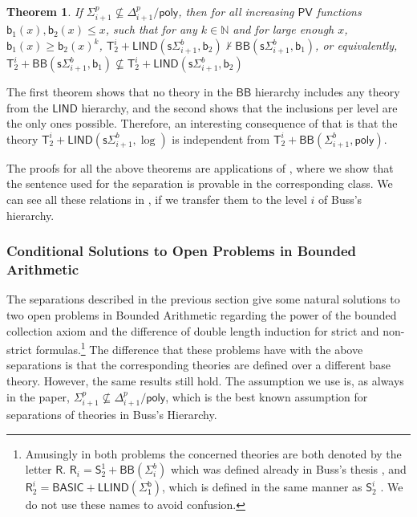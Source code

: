 \documentclass[11pt]{article}
\newcommand{\poly}{\mathsf{poly}}
\newcommand{\N}{\mathbb{N}}
\newcommand{\PV}{\mathsf{PV}}
\newcommand{\SOT}{\mathsf{S}^1_2}
\newcommand{\bd}{\mathsf{b}}
\newtheorem{theorem}{Theorem}[section]
\theoremstyle{definition}
\theoremstyle{definition}
\theoremstyle{remark}
\begin{document}
\begin{theorem}\label{thm:lindbbsep}
    If $\Sigma^p_{i+1}\not\subseteq \Delta^p_{i+1}/\poly$, then for all increasing $\PV$ functions $\bd_1(x), \bd_2(x) \leq x$, such that for any $k\in\N$ and for large enough $x$, $\bd_1(x)\geq \bd_2(x)^k$, $\mathsf{T}^i_2+\mathsf{LIND}(\mathsf{s}\Sigma^b_{i+1},\bd_2)\not\vdash \mathsf{BB}(\mathsf{s}\Sigma^b_{i+1},\bd_1)$, or equivalently, $\mathsf{T}^i_2+\mathsf{BB}(\mathsf{s}\Sigma^b_{i+1},\bd_1)\not\subseteq \mathsf{T}^i_2+\mathsf{LIND}(\mathsf{s}\Sigma^b_{i+1},\bd_2)$ 
\end{theorem}

The first theorem shows that no theory in the $\mathsf{BB}$ hierarchy includes any theory from the $\mathsf{LIND}$ hierarchy, and the second shows that the inclusions per level are the only ones possible. Therefore, an interesting consequence of that is that the theory $\mathsf{T}^i_2+\mathsf{LIND}(\mathsf{s}\Sigma^b_{i+1},\log)$ is independent from $\mathsf{T}^i_2+\mathsf{BB}(\Sigma^b_{i+1},\poly)$.

The proofs for all the above theorems are applications of , where we show that the sentence used for the separation is provable in the corresponding class. We can see all these relations in , if we transfer them to the level $i$ of Buss's hierarchy.

\subsubsection{Conditional Solutions to Open Problems in Bounded Arithmetic}

The separations described in the previous section give some natural solutions to two open problems in Bounded Arithmetic regarding the power of the bounded collection axiom and the difference of double length induction for strict and non-strict formulas.\footnote{Amusingly in both problems the concerned theories are both denoted by the letter $\mathsf{R}$. $\mathsf{R}_i= \SOT + \mathsf{BB}(\Sigma^b_i)$ which was defined already in Buss's thesis \cite{buss1985bounded}, and $\mathsf{R}^i_2= \mathsf{BASIC}+\mathsf{LLIND(\Sigma^b_1)}$, which is defined in the same manner as $\mathsf{S}^i_2$ \cite{pollett1997arithmetic}. We do not use these names to avoid confusion.} The difference that these problems have with the above separations is that the corresponding theories are defined over a different base theory. However, the same results still hold. The assumption we use is, as always in the paper, $\Sigma^p_{i+1}\not\subseteq \Delta^p_{i+1}/\poly$, which is the best known assumption for separations of theories in Buss's Hierarchy.
\end{document}
